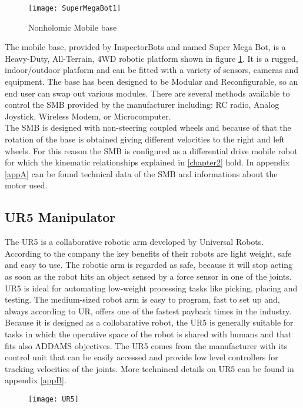 \begin{figure}[h]
	\begin{center} 
		\texttt{[image: SuperMegaBot1]}
		\centering
		\caption{Nonholomic Mobile base}
		\label{fig:SuperMegaBot1}
	\end{center}
\end{figure}
The mobile base, provided by InspectorBots and named Super Mega Bot, is a Heavy-Duty, All-Terrain, 4WD robotic platform shown in figure \ref{fig:SuperMegaBot1}. It is a rugged, indoor/outdoor platform and can be fitted with a variety of sensors, cameras and equipment. The base has been designed to be Modular and Reconfigurable, so an end user can swap out various modules. There are several methods available to control the SMB provided by the manufacturer including: RC radio, Analog Joystick, Wireless Modem, or Microcomputer.\\
The SMB is designed with non-steering coupled wheels and because of that the rotation of the base is obtained giving different velocities to the right and left wheels. For this reason the SMB is configured as a differential drive mobile robot for which the kinematic relationships explained in \ref{chapter2} hold.
In appendix \ref{appA} can be found technical data of the SMB and informations about the motor used.

\subsection{UR5 Manipulator}
The UR5 is a collaborative robotic arm developed by Universal Robots. According to the company the key benefits of their robots are light weight, safe and easy to use. The robotic arm is regarded as safe, because it will stop acting as soon as the robot hits an object sensed by a force sensor in one of the joints. UR5 is ideal for automating low-weight processing tasks like picking, placing and testing. The medium-sized robot arm is easy to program, fast to set up and, always according to UR, offers one of the fastest payback times in the industry. Because it is designed as a collobarative robot, the UR5 is generally suitable for tasks in which the operative space of the robot is shared with humans and that fits also ADDAMS objectives. The UR5 comes from the manufacturer with its control unit that can be easily accessed and provide low level controllers for tracking velocities of the joints. More technincal details on UR5 can be found in appendix \ref{appB}.

\begin{figure}[htbp]
	\begin{center} 
		\texttt{[image: UR5]}
		\centering
		\label{fig:UR5} 
	\end{center}
\end{figure}


